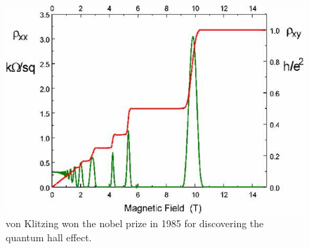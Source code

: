 \begin{figure}
	\centering
	\includegraphics[width=0.5\linewidth]{images/QuantumHall}
	\caption{von Klitzing won the nobel prize in 1985 for discovering the quantum hall effect.}
		
	
	\label{fig:quantumhall}
\end{figure}

